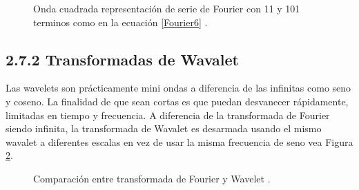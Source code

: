 \begin{figure}[h]
  \centering
  \centering
  \caption{Onda cuadrada representación de serie de Fourier con 11 y 101 terminos como en la ecuación \ref{Fourier6} \cite{FourierBook}.}
  \label{fFourier}
\end{figure}


\subsection{2.7.2 Transformadas de Wavalet}
Las wavelets son prácticamente mini ondas a diferencia de las infinitas como seno y coseno. La finalidad de que sean cortas es que puedan desvanecer rápidamente, limitadas en tiempo y frecuencia. A diferencia de la transformada de Fourier siendo infinita, la transformada de Wavalet es desarmada usando el mismo wavalet a diferentes escalas en vez de usar la misma frecuencia de seno vea Figura \ref{fWvsF}.

\begin{figure}[h]
  \centering
  \centering
  \caption{Comparación entre transformada de Fourier y Wavelet \cite{WaveVsFourier}.}
  \label{fWvsF}
\end{figure}

